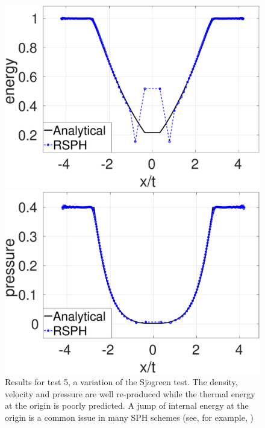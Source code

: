 \begin{figure}
\begin{minipage}{.415\textwidth}
        \includegraphics[width=0.99 \textwidth]{./Chapter-4/Figures/Sjogreen/Sjogreen-RCM-e-Adpt1}
    \end{minipage}%
    \begin{minipage}{.415 \textwidth}
        \centering
        \includegraphics[width=0.99 \textwidth]{./Chapter-4/Figures/Sjogreen/Sjogreen-RCM-p-Adpt1}
    \end{minipage}%
    \caption{Results for test 5, a variation of the Sj$\ddot{o}$green test. The density, velocity and pressure are well re-produced while the thermal energy at the origin is poorly predicted. A jump of internal energy at the origin is a common issue in many SPH schemes (see, for example, \citep{monaghan1997sph,cha2003implementations,puri2014approximate})}
    \label{fig:RCM-Sjogreen}
\end{figure}

